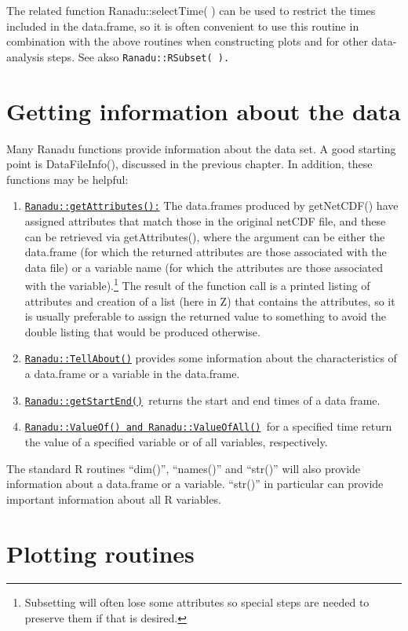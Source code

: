 \documentclass[12pt,english]{report}\usepackage[]{graphicx}\usepackage[]{color}
\begin{document}
The related function Ranadu::selectTime( ) can be used to restrict
the times included in the data.frame, so it is often convenient to
use this routine in combination with the above routines when constructing
plots and for other data-analysis steps. See akso \texttt{Ranadu::RSubset(
).}

\section{Getting information about the data}

Many Ranadu functions provide information about the data set. A good
starting point is DataFileInfo(), discussed in the previous chapter.
In addition, these functions may be helpful:
\begin{enumerate}
\item \texttt{\uline{Ranadu::getAttributes():}} The data.frames produced
by getNetCDF() have assigned attributes that match those in the original
netCDF file, and these can be retrieved via getAttributes(), where
the argument can be either the data.frame (for which the returned
attributes are those associated with the data file) or a variable
name (for which the attributes are those associated with the variable).\footnote{Subsetting will often lose some attributes so special steps are needed
to preserve them if that is desired.} The result of the function call is a printed listing of attributes
and creation of a list (here in Z) that contains the attributes, so
it is usually preferable to assign the returned value to something
to avoid the double listing that would be produced otherwise.
\item \texttt{\uline{Ranadu::TellAbout()}} provides some information
about the characteristics of a data.frame or a variable in the data.frame.
\item \texttt{\uline{Ranadu::getStartEnd()}}\texttt{ }returns the start
and end times of a data frame.
\item \texttt{\uline{Ranadu::ValueOf() and Ranadu::ValueOfAll()}}\texttt{
}for a specified time return the value of a specified variable or
of all variables, respectively.
\end{enumerate}
The standard R routines ``dim()'', ``names()'' and ``str()''
will also provide information about a data.frame or a variable. ``str()''
in particular can provide important information about all R variables.

\section{Plotting routines}
\end{document}

